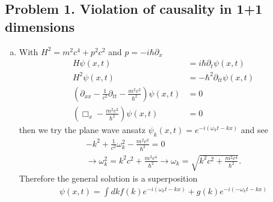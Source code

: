 \documentclass[../main.tex]{subfiles}
\begin{document}
\subsection{Problem 1. Violation of causality in 1+1 dimensions}
\begin{enumerate}[(a)]
\item With $H^2=m^2c^4+p^2c^2$ and $p=-i\hbar\partial_x$
\begin{align}
H\psi(x,t)&=i\hbar\partial_t\psi(x,t)\\
H^2\psi(x,t)&=-\hbar^2\partial_{tt}\psi(x,t)\\
\left(\partial_{xx}-\frac{1}{c^2}\partial_{tt}-\frac{m^2c^2}{\hbar^2}\right)\psi(x,t)&=0\\
\left(\Box_{x}-\frac{m^2c^2}{\hbar^2}\right)\psi(x,t)&=0
\end{align}
then we try the plane wave ansatz $\psi_k(x,t)=e^{-i(\omega_k t-kx)}$ and see
\begin{align}
-k^2+\frac{1}{c^2}\omega_k^2-\frac{m^2c^2}{\hbar^2}=0\\
\rightarrow\omega_k^2=k^2c^2+\frac{m^2c^4}{\hbar^2}
\rightarrow\omega_k=\sqrt{k^2c^2+\frac{m^2c^4}{\hbar^2}}.
\end{align}
Therefore the general solution is a superposition
\begin{align}
\psi(x,t)=\int dk f(k)e^{-i(\omega_k t-kx)} + g(k) e^{-i(-\omega_k t-kx)}
\end{align}



\end{enumerate}
\end{document}
